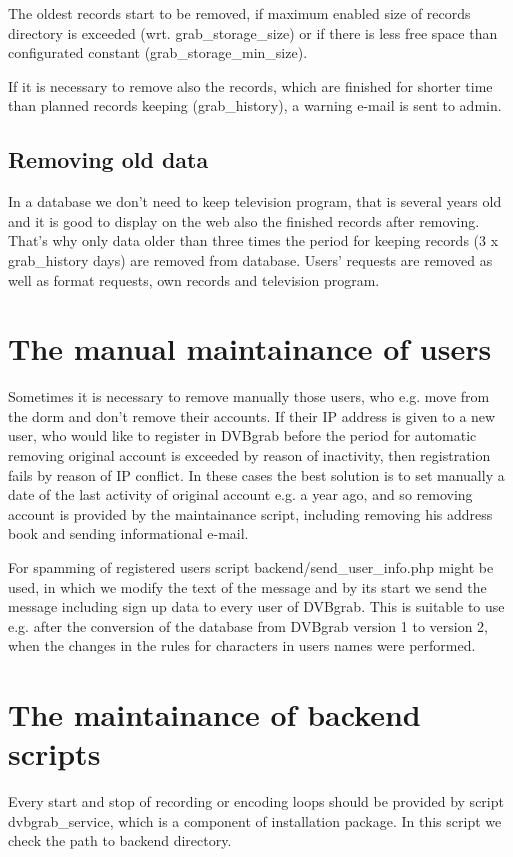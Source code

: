 The oldest records start to be removed, if maximum enabled size of records directory is exceeded (wrt. grab\_storage\_size) or if there is less free space than configurated constant (grab\_storage\_min\_size).     

If it is necessary to remove also the records, which are finished for shorter time than planned records keeping (grab\_history), a warning e-mail is sent to admin.

\subsection{Removing old data}
In a database we don't need to keep television program, that is several years old and it is good to display on the web also the finished records after removing. That's why only data older than three times the period for keeping records (3 x grab\_history days) are removed from database. Users' requests are removed as well as format requests, own records and television program.

\section{The manual maintainance of users}
Sometimes it is necessary to remove manually those users, who e.g. move from the dorm and don't remove their accounts. If their IP address is given to a new user, who would like to register in DVBgrab before the period for automatic removing original account is exceeded by reason of inactivity, then registration fails by reason of IP conflict. In these cases the best solution is to set manually a date of the last activity of original account e.g. a year ago, and so removing account is provided by the maintainance script, including removing his address book and sending informational e-mail.

For spamming of registered users script backend/send\_user\_info.php might be used, in which we modify the text of the message and by its start we send the message including sign up data to every user of DVBgrab. This is suitable to use e.g. after the conversion of the database from DVBgrab version 1 to version 2, when the changes in the rules for characters in users names were performed.

\section{The maintainance of backend scripts}
Every start and stop of recording or encoding loops should be provided by script dvbgrab\_service, which is a component of installation package. In this script we check the path to backend directory.

